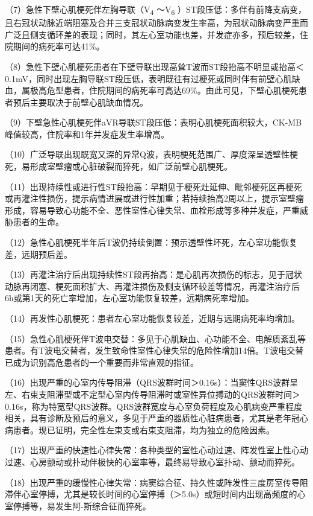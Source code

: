 （7）急性下壁心肌梗死伴左胸导联（V\textsubscript{4} ～V\textsubscript{6}
）ST段压低：多伴有前降支病变，且右冠状动脉近端阻塞及合并三支冠状动脉病变发生率高，为冠状动脉病变严重而广泛且侧支循环差的表现；同时，其左心室功能也差，并发症亦多，预后较差，住院期间的病死率可达41\%。

（8）急性下壁心肌梗死患者在下壁导联出现高耸T波而ST段抬高不明显或抬高＜0.1mV，同时出现左胸导联ST段压低，表明既往有过梗死或同时伴有前壁心肌缺血，属极高危型患者，住院期间的病死率可高达69\%。由此可见，下壁心肌梗死患者预后主要取决于前壁心肌缺血情况。

（9）下壁急性心肌梗死伴aVR导联ST段压低：表明心肌梗死面积较大，CK-MB峰值较高，住院率和1年并发症发生率增高。

（10）广泛导联出现既宽又深的异常Q波，表明梗死范围广、厚度深呈透壁性梗死，易形成室壁瘤或心脏破裂而猝死，如广泛前壁心肌梗死。

（11）出现持续性或进行性ST段抬高：早期见于梗死灶延伸、毗邻梗死区再梗死或再灌注性损伤，提示病情进展或进行性加重；若持续抬高2周以上，提示室壁瘤形成，容易导致心功能不全、恶性室性心律失常、血栓形成等多种并发症，严重威胁患者的生命。

（12）急性心肌梗死半年后T波仍持续倒置：预示透壁性坏死，左心室功能恢复差，远期预后差。

（13）再灌注治疗后出现持续性ST段再抬高：是心肌再次损伤的标志，见于冠状动脉再闭塞、梗死面积扩大、再灌注损伤及侧支循环较差等情况，再灌注治疗后6h或第1天的死亡率增加，左心室功能恢复较差，远期病死率增加。

（14）再发性心肌梗死：患者左心室功能恢复较差，近期与远期病死率均增加。

（15）急性心肌梗死伴T波电交替：多见于心肌缺血、心功能不全、电解质紊乱等患者。有T波电交替者，发生致命性室性心律失常的危险性增加14倍。T波电交替已成为识别高危患者的一个重要而非常直观的指征。

（16）出现严重的心室内传导阻滞（QRS波群时间＞0.16s）：当窦性QRS波群呈左、右束支阻滞型或不定型心室内传导阻滞时或室性异位搏动的QRS波群时间＞0.16s，称为特宽型QRS波群。QRS波群宽度与心室负荷程度及心肌病变严重程度相关，具有诊断及预后的意义，多见于严重的器质性心脏病患者，尤其是老年冠心病患者。现已证明，完全性左束支或右束支阻滞，均为独立的危险因素。

（17）出现严重的快速性心律失常：各种类型的室性心动过速、阵发性室上性心动过速、心房颤动或扑动伴极快的心室率等，最终易导致心室扑动、颤动而猝死。

（18）出现严重的缓慢性心律失常：病窦综合征、持久性或阵发性三度房室传导阻滞伴心室停搏，尤其是较长时间的心室停搏（＞5.0s）或短时间内出现高频度的心室停搏等，易发生阿-斯综合征而猝死。

